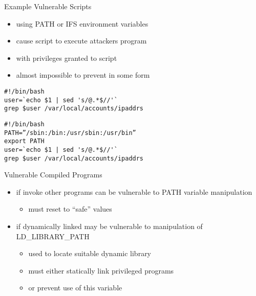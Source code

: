 \documentclass{beamer}
\begin{document}
\begin{frame}[fragile]{Example Vulnerable Scripts}
  \begin{itemize}
  \item using PATH or IFS environment variables
  \item cause script to execute attackers program
  \item with privileges granted to script
  \item almost impossible to prevent in some form
  \end{itemize}
\begin{verbatim}
#!/bin/bash
user=`echo $1 | sed 's/@.*$//'`
grep $user /var/local/accounts/ipaddrs
\end{verbatim}

\begin{verbatim}
#!/bin/bash
PATH=”/sbin:/bin:/usr/sbin:/usr/bin”
export PATH
user=`echo $1 | sed 's/@.*$//'`
grep $user /var/local/accounts/ipaddrs
\end{verbatim}

\end{frame}

\begin{frame}{Vulnerable Compiled Programs}
  \begin{itemize}
  \item if invoke other programs can be vulnerable to
    PATH variable manipulation 
  \begin{itemize}
  \item must reset to ``safe'' values
  \end{itemize}
\item if dynamically linked may be vulnerable to
  manipulation of LD\_LIBRARY\_PATH
  \begin{itemize}
  \item used to locate suitable dynamic library
  \item must either statically link privileged programs
  \item or prevent use of this variable 
  \end{itemize}
  \end{itemize}
\end{frame}
\end{document}
